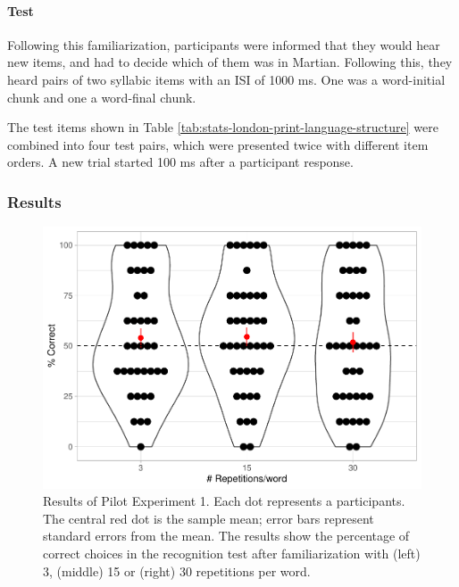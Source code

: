 \documentclass[
]{article}
\begin{document}
\hypertarget{test}{%
\paragraph{Test}\label{test}}

Following this familiarization, participants were informed that they
would hear new items, and had to decide which of them was in Martian.
Following this, they heard pairs of two syllabic items with an ISI of
1000 ms. One was a word-initial chunk and one a word-final chunk.

The test items shown in Table
\ref{tab:stats-london-print-language-structure} were combined into four
test pairs, which were presented twice with different item orders. A new
trial started 100 ms after a participant response.

\hypertarget{results-1}{%
\subsubsection{Results}\label{results-1}}

\begin{figure}

{\centering \includegraphics[width=0.8\linewidth]{segmentation_recall_combined_for_revision2_files/figure-latex/bcn-plot-stats-1} 

}

\caption{Results of Pilot Experiment 1. Each dot represents a participants. The central red dot is the sample mean; error bars represent standard errors from the mean. The results show the percentage of correct choices in the recognition test after familiarization with (left) 3, (middle) 15  or (right) 30 repetitions per word.}\label{fig:bcn-plot-stats}
\end{figure}
\end{document}

